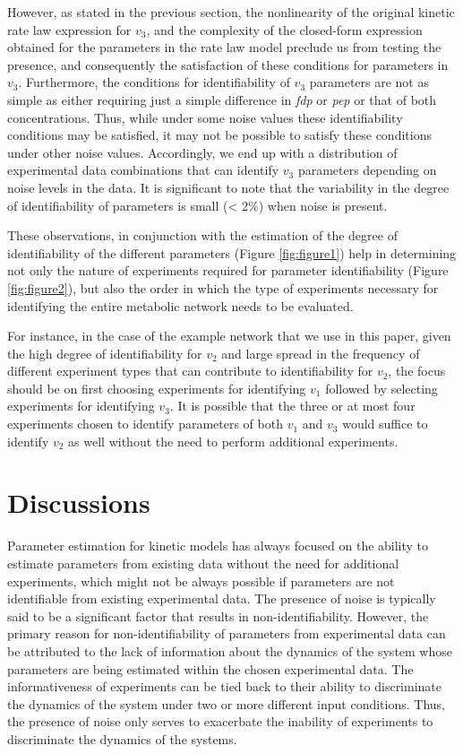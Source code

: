 \documentclass[10pt]{article}
\begin{document}
	However, as stated in the previous section, the nonlinearity of the original kinetic rate law expression for $v_3$, and the complexity of the closed-form expression obtained for the parameters in the rate law model preclude us from testing the presence, and consequently the satisfaction of these conditions for parameters in $v_3$. Furthermore, the conditions for identifiability of $v_3$ parameters are not as simple as either requiring just a simple difference in \textit{fdp} or \textit{pep} or that of both concentrations. Thus, while under some noise values these identifiability conditions may be satisfied, it may not be possible to satisfy these conditions under other noise values. Accordingly, we end up with a distribution of experimental data combinations that can identify $v_3$ parameters depending on noise levels in the data. It is significant to note that the variability in the degree of identifiability of parameters is small (< 2\%) when noise is present.
	
	These observations, in conjunction with the estimation of the degree of identifiability of the different parameters (Figure \ref{fig:figure1}) help in determining not only the nature of experiments required for parameter identifiability (Figure \ref{fig:figure2}), but also the order in which the type of experiments necessary for identifying the entire metabolic network needs to be evaluated.
	
	For instance, in the case of the example network that we use in this paper, given the high degree of identifiability for $v_2$ and large spread in the frequency of different experiment types that can contribute to identifiability for $v_2$, the focus should be on first choosing experiments for identifying $v_1$ followed by selecting experiments for identifying $v_3$. It is possible that the three or at most four experiments chosen to identify parameters of both $v_1$ and $v_3$ would suffice to identify $v_2$ as well without the need to perform additional experiments.	
	
	\section{Discussions}\label{sec:discussion}	
	Parameter estimation for kinetic models has always focused on the ability to estimate parameters from existing data without the need for additional experiments, which might not be always possible if parameters are not identifiable from existing experimental data. The presence of noise is typically said to be a significant factor that results in non-identifiability. However, the primary reason for non-identifiability of parameters from experimental data can be attributed to the lack of information about the dynamics of the system whose parameters are being estimated within the chosen experimental data. The informativeness of experiments can be tied back to their ability to discriminate the dynamics of the system under two or more different input conditions. Thus, the presence of noise only serves to exacerbate the inability of experiments to discriminate the dynamics of the systems. 
	
\end{document}

